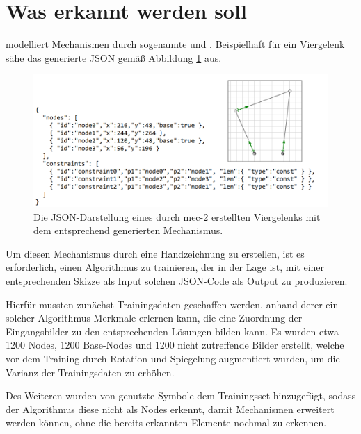 \section{Was erkannt werden soll}
 modelliert Mechanismen durch
sogenannte  und .
Beispielhaft für ein Viergelenk sähe das generierte JSON gemä{\ss} Abbildung \ref{fig:4bar} aus.

\begin{figure}
  \includegraphics[width=\textwidth]{images/4bar_json}
  \caption{Die JSON-Darstellung eines durch mec-2 erstellten Viergelenks mit dem entsprechend generierten Mechanismus.}
  \label{fig:4bar}
\end{figure}

Um diesen Mechanismus durch eine Handzeichnung zu erstellen, ist es erforderlich, einen Algorithmus zu trainieren, der in der Lage ist, mit einer entsprechenden Skizze als Input solchen JSON-Code als Output zu produzieren.

Hierfür mussten zunächst Trainingsdaten geschaffen werden, anhand derer ein solcher Algorithmus Merkmale erlernen kann, die eine Zuordnung der Eingangsbilder zu den entsprechenden Lösungen bilden kann.
Es wurden etwa 1200 Nodes, 1200 Base-Nodes und 1200 nicht zutreffende Bilder erstellt, welche vor dem Training durch Rotation und Spiegelung augmentiert wurden, um die Varianz der Trainingsdaten zu erhöhen.

Des Weiteren wurden von  genutzte Symbole dem Trainingsset hinzugefügt, sodass der Algorithmus diese nicht als Nodes erkennt, damit Mechanismen erweitert werden können, ohne die bereits erkannten Elemente nochmal zu erkennen.

